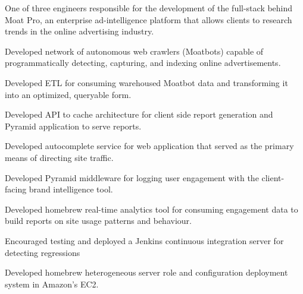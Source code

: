\documentclass[]{deedy-resume-openfont}
\begin{document}
    \begin{tightemize}
        \item
            One of three engineers responsible for the development of the
            full-stack behind Moat Pro, an enterprise ad-intelligence platform
            that allows clients to research trends in the online advertising
            industry.
        \item
            Developed network of autonomous web crawlers (Moatbots) capable
            of programmatically detecting, capturing, and indexing online
            advertisements.
        \item
            Developed ETL for consuming warehoused Moatbot data and
            transforming it into an optimized, queryable form.
        \item
            Developed API to cache architecture for client side report
            generation and Pyramid application to serve reports.
        \item
            Developed autocomplete service for web application that served
            as the primary means of directing site traffic.
        \item
            Developed Pyramid middleware for logging user engagement with
            the client-facing brand intelligence tool.
        \item
            Developed homebrew real-time analytics tool for consuming
            engagement data to build reports on site usage patterns and
            behaviour.
        \item
            Encouraged testing and deployed a Jenkins continuous integration
            server for detecting regressions
        \item
            Developed homebrew heterogeneous server role and configuration
            deployment system in Amazon’s EC2.
    \end{tightemize}
\sectionsep
\end{document}
